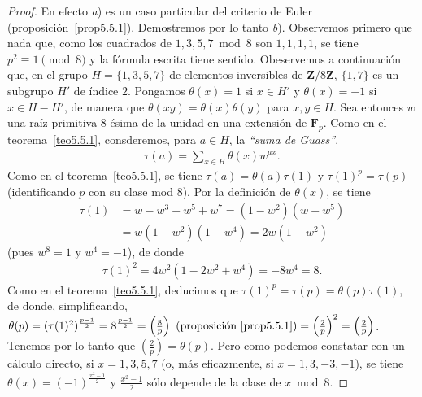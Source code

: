 \documentclass[oneside,bibtotoc,leqno,spanish]{amsbook}
\newcommand{\ZZ}{\mathbf{Z}}
\newcommand{\FF}{\mathbf{F}}
\newcommand{\QED}{}%
\newcommand{\leg}[2]{\left(\frac{#1}{#2}\right)}
\numberwithin{equation}{section}
\theoremstyle{defi}
\theoremstyle{note}
\theoremstyle{rem}
\numberwithin{theorem}{section}
\numberwithin{proposition}{section}
\numberwithin{definition}{section}
\numberwithin{lemma}{section}
\numberwithin{corollary}{section}
\numberwithin{example}{section}
\numberwithin{footnote}{section}%
\begin{document}
\begin{proof}
En efecto {\itshape a}) es un caso particular del criterio de Euler (proposici\'on~\ref{prop5.5.1}).
Demostremos por lo tanto
{\itshape b}). Observemos primero que nada que, como los cuadrados de $1, 3, 5, 7\bmod 8$ son $1,1,1,1$,
se tiene $p^{2}\equiv 1\pmod 8$ y la f\'ormula escrita tiene sentido. Obeservemos a continuaci\'on
que, en el grupo $H = \{1,3,5,7\}$ de elementos inversibles de $\ZZ/8\ZZ$, $\{1,7\}$ es un subgrupo
$H'$ de \'indice $2$. Pongamos $\theta(x) = 1$ si $x\in H'$ y $\theta(x) = -1$ si $x\in H-H'$, de manera
que $\theta(xy) = \theta(x)\theta(y)$ para $x,y\in H$. Sea entonces $w$ una ra\'iz primitiva $8$-\'esima
de la unidad en una extensi\'on de $\FF_{p}$. Como en el teorema~\ref{teo5.5.1},
consderemos, para $a\in H$, la {\em ``suma de Guass''}.
\begin{gather}
\tau(a) = \sum_{x\in H}\theta(x)w^{ax}.
\end{gather}
Como en el teorema~\ref{teo5.5.1}, se tiene $\tau(a) = \theta(a)\tau(1)$ y $\tau(1)^{p}=\tau(p)$ (identificando
$p$ con su clase mod $8$). Por la definici\'on de $\theta(x)$, se tiene
\begin{align*}
\tau(1) &= w-w^{3}-w^{5}+w^{7}=(1-w^{2})(w-w^{5})\\
&= w(1-w^{2})(1-w^{4})=2w(1-w^{2})
\end{align*}
(pues $w^{8}=1$ y $w^{4}=-1$), de donde
\begin{gather*}
\tau(1)^{2}=4w^{2}(1-2w^{2}+w^{4})=-8w^{4}=8.
\end{gather*}
Como en el teorema~\ref{teo5.5.1}, deducimos que $\tau(1)^{p}=\tau(p) = \theta(p)\tau(1)$, de donde, simplificando,
$\theta(p) = (\tau(1)^{2})^{\frac{p-1}{2}}=8^{\frac{p-1}{2}}=\leg{8}{p}
\text{ (proposici\'on~\ref{prop5.5.1})}=
\leg{2}{p}^{2}=\leg{2}{p}$. Tenemos por lo tanto que $\leg{2}{p} = \theta(p)$. Pero como podemos
constatar con un c\'alculo directo, si $x=1,3,5,7$ (o, m\'as eficazmente, si $x = 1,3,-3,-1$), se
tiene $\theta(x) = (-1)^{\frac{x^{2}-1}{2}}$ y $\frac{x^{2}-1}{2}$ s\'olo depende de la clase de $x\bmod 8$. \QED
\end{proof}
\end{document}
